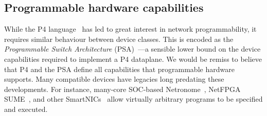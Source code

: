 \documentclass[
sigconf,natbib=false
]{acmart}
\begin{document}
\subsection{Programmable hardware capabilities}



While the P4 language~\parencite{DBLP:journals/ccr/BosshartDGIMRSTVVW14} has led to great interest in network programmability, it requires similar behaviour between device classes.
This is encoded as the \emph{Programmable Switch Architecture} (PSA)~\parencite{p4-psa}---a sensible lower bound on the device capabilities required to implement a P4 dataplane.
We would be remiss to believe that P4 and the PSA define all capabilities that programmable hardware supports.
Many compatible devices have legacies long predating these developments. 
For instance, many-core SOC-based Netronome~\parencite{netronome-smartnic}, NetFPGA SUME~\parencite{DBLP:journals/micro/ZilbermanACM14,DBLP:conf/fpga/IbanezBMZ19}, and other SmartNICs~\parencite{nvidia-bluefield,xilinx-alveo} allow virtually arbitrary programs to be specified and executed.
\end{document}

